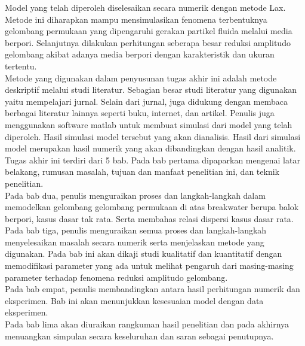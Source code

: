 \noindent Model yang telah diperoleh diselesaikan secara numerik
dengan metode Lax. Metode ini diharapkan mampu mensimulasikan
fenomena terbentuknya gelombang permukaan yang dipengaruhi gerakan
partikel fluida melalui media berpori. Selanjutnya dilakukan
perhitungan seberapa besar reduksi
amplitudo gelombang akibat adanya media berpori dengan karakteristik dan ukuran tertentu.\\


\noindent Metode yang digunakan dalam penyusunan tugas akhir ini
adalah metode deskriptif melalui studi literatur. Sebagian besar
studi literatur yang digunakan yaitu mempelajari jurnal. Selain dari
jurnal, juga didukung dengan membaca berbagai literatur lainnya
seperti buku, internet, dan artikel. Penulis juga menggunakan
software matlab untuk membuat simulasi dari model yang telah
diperoleh. Hasil simulasi model tersebut yang akan dianalisis. Hasil
dari simulasi model merupakan hasil numerik yang akan dibandingkan
dengan hasil analitik.\\


\noindent Tugas akhir ini terdiri dari 5 bab. Pada bab pertama
dipaparkan mengenai latar belakang, rumusan masalah, tujuan dan
manfaat penelitian ini, dan teknik
penelitian.\\

\noindent Pada bab dua, penulis menguraikan proses dan
langkah-langkah dalam memodelkan gelombang gelombang permukaan di
atas
breakwater berupa balok berpori, kasus dasar tak rata. Serta membahas relasi dispersi kasus dasar rata.\\

\noindent Pada bab tiga, penulis menguraikan semua proses dan
langkah-langkah menyelesaikan masalah secara numerik serta
menjelaskan metode yang digunakan. Pada bab ini akan dikaji studi kualitatif dan kuantitatif
dengan memodifikasi parameter yang ada untuk melihat pengaruh dari masing-masing parameter terhadap fenomena
reduksi amplitudo gelombang.\\

\noindent Pada bab empat, penulis membandingkan antara hasil
perhitungan numerik dan eksperimen. Bab ini akan menunjukkan
kesesuaian model dengan data eksperimen.\\

\noindent Pada bab lima akan diuraikan rangkuman hasil penelitian
dan pada akhirnya menuangkan simpulan secara keseluruhan dan saran
sebagai penutupnya.\\

